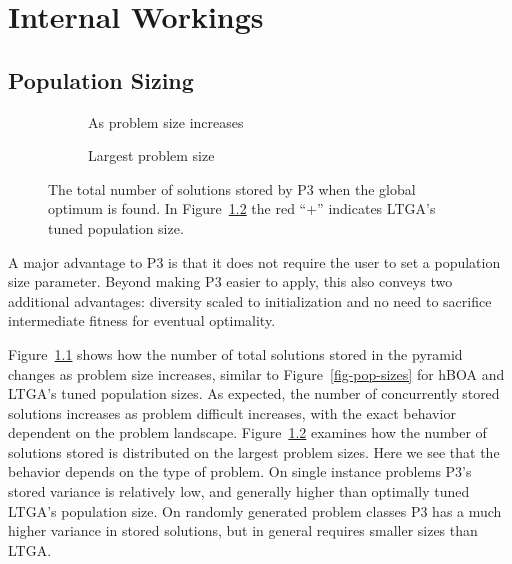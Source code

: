 \chapter{Internal Workings}

\section{Population Sizing}
\begin{figure}[t]
  \begin{centering}
    \begin{subfigure}{.5\textwidth}
      \begin{centering}
      \end{centering}
      \caption{As problem size increases}
      \label{fig-pop-p3}
    \end{subfigure}%
    \begin{subfigure}{.5\textwidth}
      \begin{centering}
      \end{centering}
      \caption{Largest problem size}
      \label{fig-solutions-stored}
    \end{subfigure}
  \end{centering}
  \caption{The total number of solutions stored by P3 when the global optimum is found.
           In Figure~\ref{fig-solutions-stored} the red ``+'' indicates LTGA's tuned population size.}
  \label{fig-p3-storage}
\end{figure}

A major advantage to P3 is that it does not require the user to set a population size parameter.
Beyond making P3 easier to apply, this also conveys two additional advantages: diversity scaled
to initialization and no need to sacrifice intermediate fitness for eventual optimality.

Figure~\ref{fig-pop-p3} shows how the number of total solutions stored in the pyramid changes
as problem size increases, similar to Figure~\ref{fig-pop-sizes} for hBOA and LTGA's tuned population sizes.
As expected, the number of concurrently stored solutions increases as problem difficult increases, with the
exact behavior dependent on the problem landscape. Figure~\ref{fig-solutions-stored} examines how the number
of solutions stored is distributed on the largest problem sizes. Here we see that the behavior depends
on the type of problem. On single instance problems P3's stored variance is relatively low, and generally
higher than optimally tuned LTGA's population size. On randomly generated problem classes P3 has a much
higher variance in stored solutions, but in general requires smaller sizes than LTGA.

